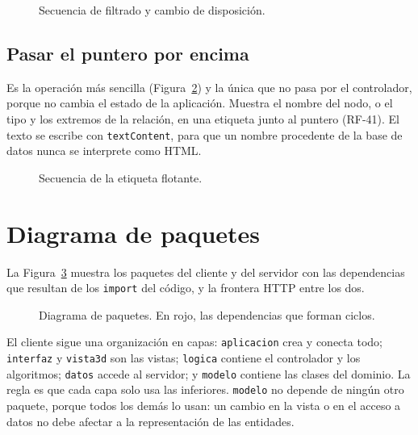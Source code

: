 \begin{figure}[htbp]
  \centering
  \caption{Secuencia de filtrado y cambio de disposición.}
  \label{fig:sec-filtrar}
\end{figure}

\subsection{Pasar el puntero por encima}

Es la operación más sencilla (Figura~\ref{fig:sec-puntero}) y la única que no pasa por el controlador, porque no cambia el estado de la aplicación. Muestra el nombre del nodo, o el tipo y los extremos de la relación, en una etiqueta junto al puntero (RF-41). El texto se escribe con \texttt{textContent}, para que un nombre procedente de la base de datos nunca se interprete como HTML.

\begin{figure}[htbp]
  \centering
  \caption{Secuencia de la etiqueta flotante.}
  \label{fig:sec-puntero}
\end{figure}

\section{Diagrama de paquetes}
\label{sec:paquetes}

La Figura~\ref{fig:paquetes} muestra los paquetes del cliente y del servidor con las dependencias que resultan de los \texttt{import} del código, y la frontera HTTP entre los dos.

\begin{figure}
  \centering
  \caption{Diagrama de paquetes. En rojo, las dependencias que forman ciclos.}
  \label{fig:paquetes}
\end{figure}

El cliente sigue una organización en capas: \texttt{aplicacion} crea y conecta todo; \texttt{interfaz} y \texttt{vista3d} son las vistas; \texttt{logica} contiene el controlador y los algoritmos; \texttt{datos} accede al servidor; y \texttt{modelo} contiene las clases del dominio. La regla es que cada capa solo usa las inferiores. \texttt{modelo} no depende de ningún otro paquete, porque todos los demás lo usan: un cambio en la vista o en el acceso a datos no debe afectar a la representación de las entidades.

